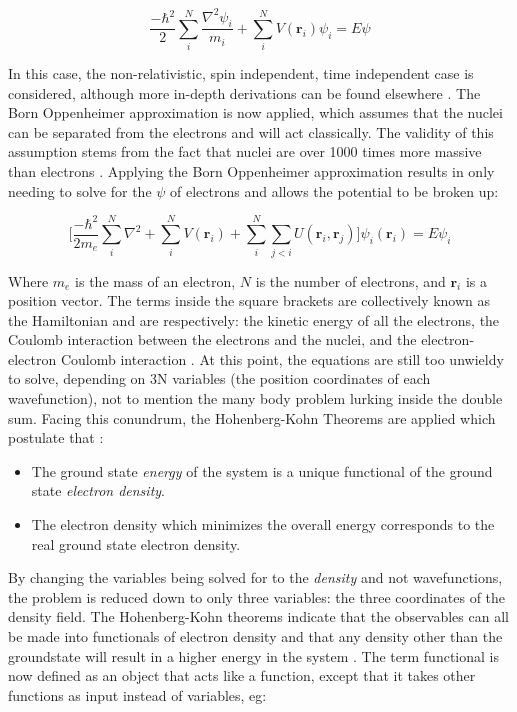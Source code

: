 \begin{equation}
	\frac{-\hbar^2}{2} \sum_{i}^{N} \frac{\nabla^2 \psi_i}{m_i} + \sum_{i}^{N} V(\textbf{r}_i) \psi_i = E \psi
\end{equation}

In this case, the non-relativistic, spin independent, time independent case is considered, although more in-depth derivations can be found elsewhere \cite{tddft}. The Born Oppenheimer approximation is now applied, which assumes that the nuclei can be separated from the electrons and will act classically. The validity of this assumption stems from the fact that nuclei are over 1000 times more massive than electrons \cite{graff_direct_1980}.  Applying the Born Oppenheimer approximation results in only needing to solve for the $\psi$ of electrons and allows the potential to be broken up:

\begin{equation}
	\bigg[\frac{-\hbar^2}{2m_e}\sum_{i}^{N} \nabla^2 +\sum_{i}^{N} V(\textbf{r}_i) + \sum_{i}^{N}\sum_{j <i}U(\textbf{r}_i,\textbf{r}_j) \bigg] \psi_i(\textbf{r}_i) = E \psi_i
\end{equation}

Where $m_e$ is the mass of an electron, $N$ is the number of electrons, and $\textbf{r}_i$ is a position vector. The terms inside the square brackets are collectively known as the Hamiltonian and are respectively: the kinetic energy of all the electrons, the Coulomb interaction between the electrons and the nuclei, and the electron-electron Coulomb interaction  \cite{sholl_density_2009}. At this point, the equations are still too unwieldy to solve, depending on 3N variables (the position coordinates of each wavefunction), not to mention the many body problem lurking inside the double sum.  Facing this conundrum, the Hohenberg-Kohn Theorems are applied which postulate that \cite{hohenberg_inhomogeneous_1964}:
\begin{itemize}
	\item  The ground state \textit{energy} of the system is a unique functional of the ground state \textit{electron density}.
	\item The electron density which minimizes the overall energy corresponds to the real ground state electron density.  
\end{itemize}

By changing the variables being solved for to the \textit{density} and not wavefunctions, the problem is reduced down to only three variables: the three coordinates of the density field.  The Hohenberg-Kohn theorems indicate that the observables can all be made into functionals of electron density and that any density other than the groundstate will result in a higher energy in the system \cite{parr_density_1983}.  The term functional is now defined as an object that acts like a function, except that it takes other functions as input instead of variables, eg:

